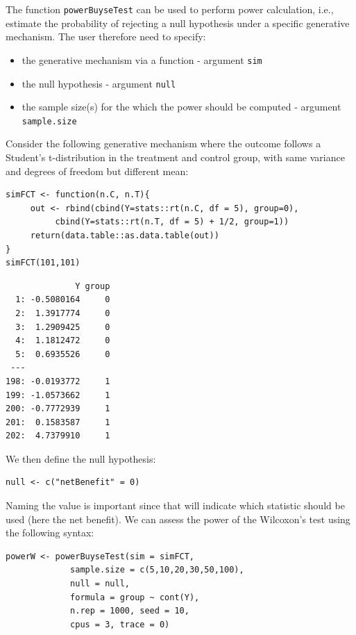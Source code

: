 \documentclass[12pt]{article}
\begin{document}
The function \texttt{powerBuyseTest} can be used to perform power
calculation, i.e., estimate the probability of rejecting a null
hypothesis under a specific generative mechanism. The user therefore
need to specify:
\begin{itemize}
\item the generative mechanism via a function \hfill - argument \texttt{sim}
\item the null hypothesis \hfill - argument \texttt{null}
\item the sample size(s) for the which the power should be computed  \hfill - argument \texttt{sample.size}
\end{itemize}

\bigskip

Consider the following generative mechanism where the outcome follows
a Student's t-distribution in the treatment and control group, with same
variance and degrees of freedom but different mean:
\lstset{language=r,label= ,caption= ,captionpos=b,numbers=none}
\begin{lstlisting}
simFCT <- function(n.C, n.T){
     out <- rbind(cbind(Y=stats::rt(n.C, df = 5), group=0),
		  cbind(Y=stats::rt(n.T, df = 5) + 1/2, group=1))
     return(data.table::as.data.table(out))
}
simFCT(101,101)
\end{lstlisting}

\begin{verbatim}
              Y group
  1: -0.5080164     0
  2:  1.3917774     0
  3:  1.2909425     0
  4:  1.1812472     0
  5:  0.6935526     0
 ---                 
198: -0.0193772     1
199: -1.0573662     1
200: -0.7772939     1
201:  0.1583587     1
202:  4.7379910     1
\end{verbatim}

We then define the null hypothesis:
\lstset{language=r,label= ,caption= ,captionpos=b,numbers=none}
\begin{lstlisting}
null <- c("netBenefit" = 0)
\end{lstlisting}

Naming the value is important since that will indicate which statistic
should be used (here the net benefit). We can assess the power of the
Wilcoxon's test using the following syntax:
\lstset{language=r,label= ,caption= ,captionpos=b,numbers=none}
\begin{lstlisting}
powerW <- powerBuyseTest(sim = simFCT, 
			 sample.size = c(5,10,20,30,50,100),
			 null = null,
			 formula = group ~ cont(Y), 
			 n.rep = 1000, seed = 10,
			 cpus = 3, trace = 0)
\end{lstlisting}
\end{document}
